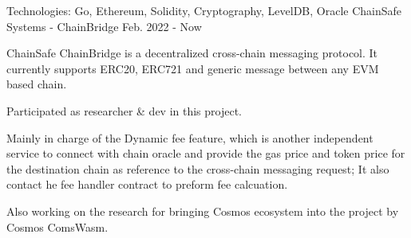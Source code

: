 \begin{cventries}
\cventry
    {Technologies: \quad Go, Ethereum, Solidity, Cryptography, LevelDB, Oracle}
    {ChainSafe Systems - ChainBridge}
    {}
    {Feb. 2022 - Now}
    {
      \begin{cvitems}
        \item {ChainSafe ChainBridge is a decentralized cross-chain messaging protocol. It currently supports ERC20, ERC721 and generic message between any EVM based chain.}
        \item {Participated as researcher \& dev in this project.}
        \item {Mainly in charge of the Dynamic fee feature, which is another independent service to connect with chain oracle and provide the gas price and token price for the destination chain as reference to the cross-chain messaging request; It also contact he fee handler contract to preform fee calcuation.}
        \item {Also working on the research for bringing Cosmos ecosystem into the project by Cosmos ComsWasm.}
      \end{cvitems}
    }



\end{cventries}
